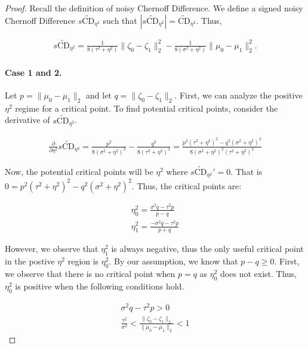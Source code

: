 \documentclass[10pt,a4paper]{amsart}
\begin{document}
\begin{proof}

 
 Recall the definition of noisy Chernoff Difference. We define a signed noisy Chernoff Difference $s\widetilde{\text{CD}}_{\eta^2}$ such that $|s\widetilde{\text{CD}}_{\eta^2}| = \widetilde{\text{CD}}_{\eta^2}$. Thus,

\begin{align}
      s \widetilde{\text{CD}}_{\eta^2}=
     \frac{1}{8(\tau^2 + \eta^2)}\|\zeta_0 - \zeta_1\|^2_2 - \frac{1}{8(\sigma^2+\eta^2)}\|\mu_0 - \mu_1\|^2_2.
\end{align}

\paragraph{Case 1 and 2.}Let $p = \|\mu_0 - \mu_1\|_2$ and let $q = \|\zeta_0 - \zeta_1\|_2$. First, we can analyze the positive $\eta^2$ regime for a critical point. To find potential critical points, consider the derivative of $s\widetilde{\text{CD}}_{\eta^2}$.

\begin{align}
    \frac{\partial}{\partial\eta^2} s \widetilde{\text{CD}}_{\eta^2}  = \frac{p^2}{8(\sigma^2 + \eta^2)^2} - \frac{q^2}{8(\tau^2 + \eta^2)^2} = \frac{p^2(\tau^2 + \eta^2)^2-q^2(\sigma^2 + \eta^2)^2}{8(\sigma^2 + \eta^2)^2(\tau^2 + \eta^2)^2}
\end{align}

Now, the potential critical points will be $\eta^2$ where $s\widetilde{\text{CD}}_{\eta^2}' = 0$. That is $0 = p^2(\tau^2 + \eta^2)^2-q^2(\sigma^2 + \eta^2)^2$. Thus, the critical points are:

\begin{align}
    \eta_0^2 = \frac{\sigma^2q-\tau^2p}{p-q} \\\eta_1^2 =\frac{-\sigma^2q-\tau^2p}{p+q}
\end{align}



However, we observe that $\eta_1^2$ is always negative, thus the only useful critical point in the postive $\eta^2$ region is $\eta_0^2$. By our assumption, we know that $p-q \geq 0$. First, we observe that there is no critical point when $p=q$ as $\eta_0^2$ does not exist. Thus, $\eta_0^2$ is positive when the following conditions hold.

\begin{align}
    \sigma^2q-\tau^2p >0 \\
    \frac{\tau^2}{\sigma^2} < \frac{\|\zeta_0 - \zeta_1\|_2}{\|\mu_0 - \mu_1\|_2} < 1
\end{align}


\end{proof}
\end{document}

